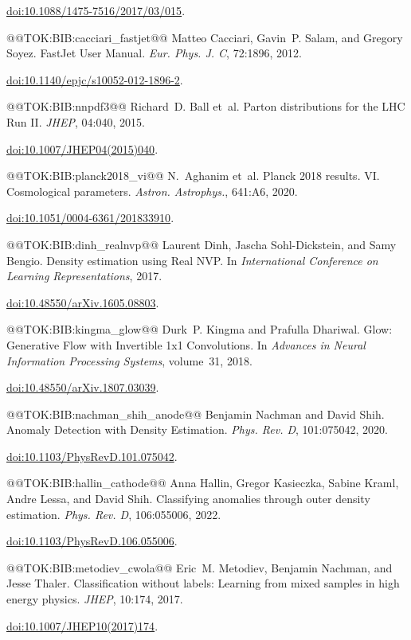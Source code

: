 \documentclass{article}
\begin{document}
  \href{https://doi.org/10.1088/1475-7516/2017/03/015}{doi:10.1088/1475-7516/2017/03/015}.

@@TOK:BIB:cacciari_fastjet@@ Matteo Cacciari, Gavin~P. Salam, and Gregory Soyez.
  {FastJet User Manual}.
  {\em Eur. Phys. J. C}, 72:1896, 2012.
 
  \href{https://doi.org/10.1140/epjc/s10052-012-1896-2}{doi:10.1140/epjc/s10052-012-1896-2}.

@@TOK:BIB:nnpdf3@@ Richard~D. Ball et~al.
  {Parton distributions for the LHC Run II}.
  {\em JHEP}, 04:040, 2015.
 
  \href{https://doi.org/10.1007/JHEP04(2015)040}{doi:10.1007/JHEP04(2015)040}.

@@TOK:BIB:planck2018_vi@@ N.~Aghanim et~al.
  {Planck 2018 results. VI. Cosmological parameters}.
  {\em Astron. Astrophys.}, 641:A6, 2020.
 
  \href{https://doi.org/10.1051/0004-6361/201833910}{doi:10.1051/0004-6361/201833910}.

@@TOK:BIB:dinh_realnvp@@ Laurent Dinh, Jascha Sohl-Dickstein, and Samy Bengio.
  {Density estimation using Real NVP}.
  In {\em International Conference on Learning Representations}, 2017.
 
  \href{https://doi.org/10.48550/arXiv.1605.08803}{doi:10.48550/arXiv.1605.08803}.

@@TOK:BIB:kingma_glow@@ Durk~P. Kingma and Prafulla Dhariwal.
  {Glow: Generative Flow with Invertible 1x1 Convolutions}.
  In {\em Advances in Neural Information Processing Systems},
  volume~31, 2018.
 
  \href{https://doi.org/10.48550/arXiv.1807.03039}{doi:10.48550/arXiv.1807.03039}.

@@TOK:BIB:nachman_shih_anode@@ Benjamin Nachman and David Shih.
  {Anomaly Detection with Density Estimation}.
  {\em Phys. Rev. D}, 101:075042, 2020.
 
  \href{https://doi.org/10.1103/PhysRevD.101.075042}{doi:10.1103/PhysRevD.101.075042}.

@@TOK:BIB:hallin_cathode@@ Anna Hallin, Gregor Kasieczka, Sabine Kraml, Andre Lessa, and David Shih.
  {Classifying anomalies through outer density estimation}.
  {\em Phys. Rev. D}, 106:055006, 2022.
 
  \href{https://doi.org/10.1103/PhysRevD.106.055006}{doi:10.1103/PhysRevD.106.055006}.

@@TOK:BIB:metodiev_cwola@@ Eric~M. Metodiev, Benjamin Nachman, and Jesse Thaler.
  {Classification without labels: Learning from mixed samples in high
  energy physics}.
  {\em JHEP}, 10:174, 2017.
 
  \href{https://doi.org/10.1007/JHEP10(2017)174}{doi:10.1007/JHEP10(2017)174}.
\end{document}

